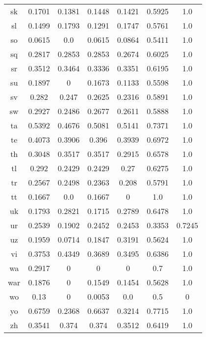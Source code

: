 \begin{figure}[h]
\begin{tabular}{ccccccc}
sk&0.1701&0.1381&0.1448&0.1421&0.5925&1.0\\
sl&0.1499&0.1793&0.1291&0.1747&0.5761&1.0\\
so&0.0615&0.0&0.0615&0.0864&0.5411&1.0\\
sq&0.2817&0.2853&0.2853&0.2674&0.6025&1.0\\
sr&0.3512&0.3464&0.3336&0.3351&0.6195&1.0\\
su&0.1897&0&0.1673&0.1133&0.5598&1.0\\
sv&0.282&0.247&0.2625&0.2316&0.5891&1.0\\
sw&0.2927&0.2486&0.2677&0.2611&0.5888&1.0\\
ta&0.5392&0.4676&0.5081&0.5141&0.7371&1.0\\
te&0.4073&0.3906&0.396&0.3939&0.6972&1.0\\
th&0.3048&0.3517&0.3517&0.2915&0.6578&1.0\\
tl&0.292&0.2429&0.2429&0.27&0.6275&1.0\\
tr&0.2567&0.2498&0.2363&0.208&0.5791&1.0\\
tt&0.1667&0.0&0.1667&0&1.0&1.0\\
uk&0.1793&0.2821&0.1715&0.2789&0.6478&1.0\\
ur&0.2539&0.1902&0.2452&0.2453&0.3353&0.7245\\
uz&0.1959&0.0714&0.1847&0.3191&0.5624&1.0\\
vi&0.3753&0.4349&0.3689&0.3495&0.6386&1.0\\
wa&0.2917&0&0&0&0.7&1.0\\
war&0.1876&0&0.1549&0.1454&0.5628&1.0\\
wo&0.13&0&0.0053&0.0&0.5&0\\
yo&0.6759&0.2368&0.6637&0.3214&0.7715&1.0\\
zh&0.3541&0.374&0.374&0.3512&0.6419&1.0\\
\hline\hline
\end{tabular}
\end{figure}
